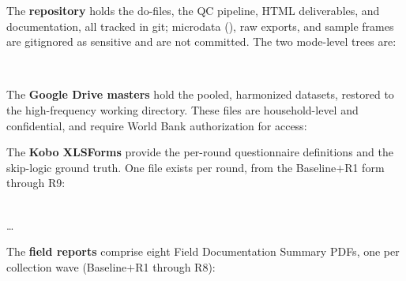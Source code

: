 The \textbf{repository} holds the do-files, the QC pipeline, HTML deliverables, and documentation, all tracked in git; microdata (), raw exports, and sample frames are gitignored as sensitive and are not committed. The two mode-level trees are:

\begin{refbox}
 \\
\end{refbox}

The \textbf{Google Drive masters} hold the pooled, harmonized  datasets, restored to the high-frequency working directory. These files are household-level and confidential, and require World Bank authorization for access:

\begin{refbox}
\end{refbox}

The \textbf{Kobo XLSForms} provide the per-round questionnaire definitions and the skip-logic ground truth. One file exists per round, from the Baseline$+$R1 form through R9:

\begin{refbox}
 \\
 \ldots{} 
\end{refbox}

The \textbf{field reports} comprise eight Field Documentation Summary PDFs, one per collection wave (Baseline$+$R1 through R8):

\begin{refbox}
\end{refbox}
